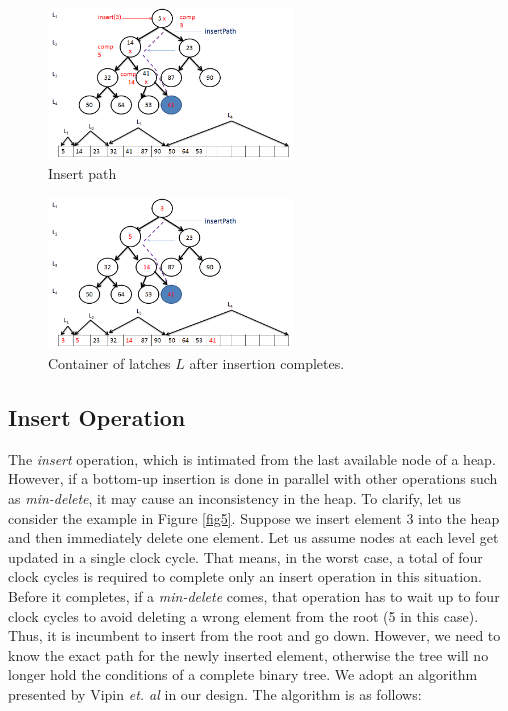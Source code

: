\documentclass[10pt, conference, compsocconf]{IEEEtran}
\begin{document}
\begin{figure}[!ht]
  \centering
  \includegraphics[width=6.5cm]{Figures/6.png}
      \caption{Insert path}
    \label{fig6}
\end{figure}

\begin{figure}[!ht]
  \centering
  \includegraphics[width=6.5cm]{Figures/7.png}
      \caption{Container of latches $L$ after insertion completes.}
    \label{fig7}
\end{figure}

\subsection{Insert Operation}

The {\it insert} operation, which is intimated from the last available node of a heap.
However, if a bottom-up insertion is done in parallel with other operations such as {\it min-delete}, it may cause an inconsistency in the heap.
To clarify, let us consider the example in Figure \ref{fig5}.
Suppose we insert element $3$ into the heap and then immediately delete one element.
Let us assume nodes at each level get updated in a single clock cycle.
That means, in the worst case, a total of four clock cycles is required to complete only an insert operation in this situation.
Before it completes, if a {\it min-delete} comes, that operation has to wait up to four clock cycles to avoid deleting a wrong element from the root (5 in this case).
Thus, it is incumbent to insert from the root and go down.
However, we need to know the exact path for the newly inserted element, otherwise the tree will no longer hold the conditions of a complete binary tree.
We adopt an algorithm presented by Vipin {\it et. al} \cite{pq6} in our design. The algorithm is as follows:
\end{document}
